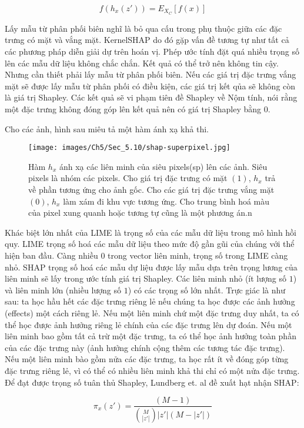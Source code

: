 \begin{enumerate}
$$f(h_x(z'))=E_{X_C}[f(x)]$$

Lấy mẫu từ phân phối biên nghĩ là bỏ qua cấu trong phụ thuộc giữa các đặc trưng có mặt và vắng mặt. KernelSHAP do đó gặp vấn đề tương tự như tất cả các phương pháp diễn giải dự trên hoán vị. Phép ước tính đặt quá nhiều trọng số lên các mẫu dữ liệu không chắc chắn. Kết quả có thể trở nên không tin cậy. Nhưng cần thiết phải lấy mẫu từ phân phối biên. Nếu các giá trị đặc trưng vắng mặt sẽ được lấy mẫu từ phân phối có điều kiện, các giá trị kết qủa sẽ không còn là giá trị Shapley. Các kết quả sẽ vi phạm tiên đề Shapley về Nộm tính, nói rằng một đặc trưng không đóng góp lên kết quả nên có giá trị Shapley bằng $0$. 

Cho các ảnh, hình sau miêu tả một hàm ánh xạ khả thi.

\begin{figure*}[h!]
	\centering
	\texttt{[image: images/Ch5/Sec\_5.10/shap-superpixel.jpg]}
	\label{fig:5_49}
	\caption{Hàm $h_x$ ánh xạ các liên minh của siêu pixels(sp) lên các ảnh. Siêu pixels là nhóm các pixels. Cho giá trị đặc trưng có mặt $(1)$,  $h_x$ trả về phần tương ứng cho ảnh gốc. Cho các giá trị đặc trưng vắng mặt $(0)$, $h_x$ làm xám đi khu vực tương ứng. Cho trung bình hoá màu của pixel xung quanh hoặc tương tự cũng là một phương án.n}
\end{figure*}

Khác biệt lớn nhất của LIME là trọng số của các mẫu dữ liệu trong mô hình hồi quy. LIME trọng số hoá các mẫu dữ liệu theo mức độ gần gũi của chúng với thể hiện ban đầu. Càng nhiều $0$ trong vector liên minh, trọng số trong LIME càng nhỏ. SHAP trọng số hoá các mẫu dự liệu được lấy mẫu dựa trên trọng lương của liên minh sẽ lấy trong ước tính giá trị Shapley. Các liên minh nhỏ (ít lượng số $1$) và liên minh lớn (nhiều lượng số $1$) có các trọng số lớn nhất. Trực giác là như sau: ta học hầu hết các đặc trưng riêng lẻ nếu chúng ta học được các ảnh hưởng (effects) một cách riêng lẻ. Nếu một liên minh chứ một đặc trưng duy nhất, ta có thể học được ảnh hưởng riêng lẻ chính của các đặc trưng lên dự đoán. Nếu một liên minh bao gồm tất cả trừ một đặc trưng, ta có thể học ảnh hưởng toàn phần của các đặc trưng này (ảnh hưởng chính cộng thêm các tương tác đặc trưng). Nếu một liên minh bào gồm nửa các đặc trưng, ta học rất ít về đóng góp từng đặc trưng riêng lẻ, vì có thể có nhiều liên minh khả thi chỉ có một nửa đặc trưng. Để đạt được trọng số tuân thủ Shapley, Lundberg et. al đề xuất hạt nhận SHAP:

$$\pi_{x}(z')=\frac{(M-1)}{\binom{M}{|z'|}|z'|(M-|z'|)}$$


\end{enumerate}

